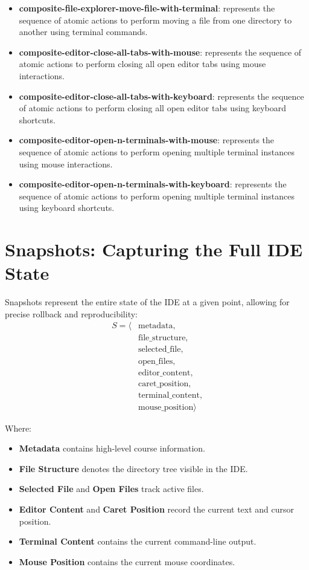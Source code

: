 \documentclass[11pt, a4paper]{article}
\begin{document}
\begin{itemize}
    \item \textbf{composite-file-explorer-move-file-with-terminal}: represents the sequence of atomic actions to perform moving a file from one directory to another using terminal commands.
    \item \textbf{composite-editor-close-all-tabs-with-mouse}: represents the sequence of atomic actions to perform closing all open editor tabs using mouse interactions.
    \item \textbf{composite-editor-close-all-tabs-with-keyboard}: represents the sequence of atomic actions to perform closing all open editor tabs using keyboard shortcuts.
    \item \textbf{composite-editor-open-n-terminals-with-mouse}: represents the sequence of atomic actions to perform opening multiple terminal instances using mouse interactions.
    \item \textbf{composite-editor-open-n-terminals-with-keyboard}: represents the sequence of atomic actions to perform opening multiple terminal instances using keyboard shortcuts.
\end{itemize}

\section{Snapshots: Capturing the Full IDE State}
\label{sec:snapshots}

Snapshots represent the entire state of the IDE at a given point, allowing for precise rollback and reproducibility:
\begin{align*}
    S = \langle & \text{metadata},\\
    & \text{file\_structure},\\
    & \text{selected\_file},\\
    & \text{open\_files},\\
    & \text{editor\_content},\\
    & \text{caret\_position},\\
    & \text{terminal\_content},\\
    & \text{mouse\_position}
    \rangle
\end{align*}

Where:

\begin{itemize}
    \item \textbf{Metadata} contains high-level course information.
    \item \textbf{File Structure} denotes the directory tree visible in the IDE.
    \item \textbf{Selected File} and \textbf{Open Files} track active files.
    \item \textbf{Editor Content} and \textbf{Caret Position} record the current text and cursor position.
    \item \textbf{Terminal Content} contains the current command-line output.
    \item \textbf{Mouse Position} contains the current mouse coordinates.
\end{itemize}
\end{document}
